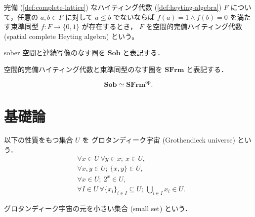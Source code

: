 \documentclass[titlepage]{ltjsreport}
\newtheorem[S]{theorem}{定理}[chapter]
\newtheorem[S]{definition}[theorem]{定義}
\newtheorem[S]{example}[theorem]{例}
\begin{document}
\begin{definition}[空間的完備ハイティング代数]
  完備
  (\cref{def:complete-lattice})
  なハイティング代数
  (\cref{def:heyting-algebra})
  $F$
  について，任意の
  $a,b\in F$
  に対して
  $a\le b$
  でないならば
  $f(a)=1\wedge f(b)=0$
  を満たす束準同型
  $f:F\to\{0,1\}$
  が存在するとき，
  $F$
  を空間的完備ハイティング代数
  (spatial complete Heyting algebra)
  という。
\end{definition}

\newcommand{\sob}{\mathbf{Sob}}
\newcommand{\sfrm}{\mathbf{SFrm}}

\begin{definition}
  sober 空間と連続写像のなす圏を $\sob$ と表記する．
\end{definition}

\begin{definition}[空間的完備ハイティング代数の圏]
  空間的完備ハイティング代数と束準同型のなす圏を $\sfrm$ と表記する．
\end{definition}

\begin{theorem}[ストーンの双対性定理]
  \begin{equation}
    \sob\simeq\sfrm^\mathrm{op}.
  \end{equation}
\end{theorem}

\appendix

\chapter{基礎論}

\begin{definition}[グロタンディーク宇宙]
  \def\U{U}%
  \def\x{x}%
  \def\y{y}%
  以下の性質をもつ集合 $\U$ を
  グロタンディーク宇宙 (Grothendieck universe) という．
  \begin{align}
     & \forall\x\in\U\ \forall\y\in\x;\ \x\in\U,              \\
     & \forall\x,\y\in\U;\ \{\x,\y\}\in\U,                    \\
     & \forall\x\in\U;\ 2^\x\in\U,                            \\
     & \forall I\in\U\ \forall{\{\x_i\}}_{i\in I}\subseteq\U;
    \ \bigcup_{i\in I}\x_i\in\U.
  \end{align}
\end{definition}

\begin{definition}[小さい集合]\label{def:small-set}
  グロタンディーク宇宙の元を小さい集合 (small set) という．
\end{definition}
\end{document}
